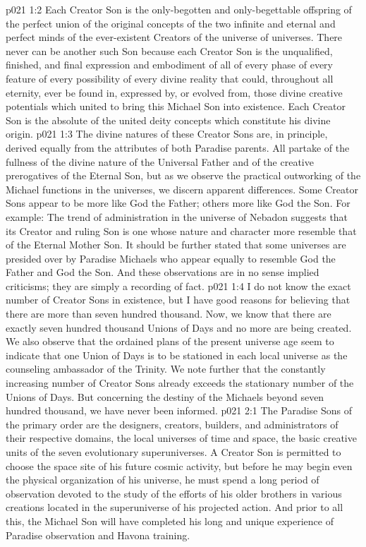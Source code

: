 \vs p021 1:2 Each Creator Son is the only\hyp{}begotten and only\hyp{}begettable offspring of the perfect union of the original concepts of the two infinite and eternal and perfect minds of the ever\hyp{}existent Creators of the universe of universes. There never can be another such Son because each Creator Son is the unqualified, finished, and final expression and embodiment of all of every phase of every feature of every possibility of every divine reality that could, throughout all eternity, ever be found in, expressed by, or evolved from, those divine creative potentials which united to bring this Michael Son into existence. Each Creator Son is the absolute of the united deity concepts which constitute his divine origin.
\vs p021 1:3 The divine natures of these Creator Sons are, in principle, derived equally from the attributes of both Paradise parents. All partake of the fullness of the divine nature of the Universal Father and of the creative prerogatives of the Eternal Son, but as we observe the practical outworking of the Michael functions in the universes, we discern apparent differences. Some Creator Sons appear to be more like God the Father; others more like God the Son. For example: The trend of administration in the universe of Nebadon suggests that its Creator and ruling Son is one whose nature and character more resemble that of the Eternal Mother Son. It should be further stated that some universes are presided over by Paradise Michaels who appear equally to resemble God the Father and God the Son. And these observations are in no sense implied criticisms; they are simply a recording of fact.
\vs p021 1:4 I do not know the exact number of Creator Sons in existence, but I have good reasons for believing that there are more than seven hundred thousand. Now, we know that there are exactly seven hundred thousand Unions of Days and no more are being created. We also observe that the ordained plans of the present universe age seem to indicate that one Union of Days is to be stationed in each local universe as the counseling ambassador of the Trinity. We note further that the constantly increasing number of Creator Sons already exceeds the stationary number of the Unions of Days. But concerning the destiny of the Michaels beyond seven hundred thousand, we have never been informed.
\vs p021 2:1 The Paradise Sons of the primary order are the designers, creators, builders, and administrators of their respective domains, the local universes of time and space, the basic creative units of the seven evolutionary superuniverses. A Creator Son is permitted to choose the space site of his future cosmic activity, but before he may begin even the physical organization of his universe, he must spend a long period of observation devoted to the study of the efforts of his older brothers in various creations located in the superuniverse of his projected action. And prior to all this, the Michael Son will have completed his long and unique experience of Paradise observation and Havona training.
